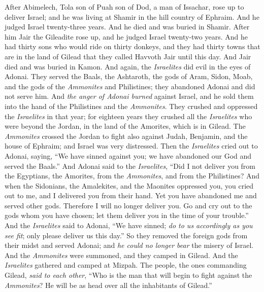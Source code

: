 \begin{biblechapter} %
 After Abimelech, Tola son of Puah son of Dod, a man of Issachar, rose up to deliver Israel; and he was living at Shamir in the hill country of Ephraim.
\verse And he judged Israel twenty-three years. And he died and was buried in Shamir.
\verse After him Jair the Gileadite rose up, and he judged Israel twenty-two years.
\verse And he had thirty sons who would ride on thirty donkeys, and they had thirty towns that are in the land of Gilead that they called Havvoth Jair until this day.
\verse And Jair died and was buried in Kamon.
\verse And again, the \textit{Israelites} did evil in the eyes of Adonai. They served the Baals, the Ashtaroth, the gods of Aram, Sidon, Moab, and the gods of the \textit{Ammonites} and Philistines; they abandoned Adonai and did not serve him.
\verse And \textit{the anger of Adonai burned} against Israel, and he sold them into the hand of the Philistines and the \textit{Ammonites}.
\verse They crushed and oppressed the \textit{Israelites} in that year; for eighteen years they crushed all the \textit{Israelites} who were beyond the Jordan, in the land of the Amorites, which is in Gilead.
\verse The \textit{Ammonites} crossed the Jordan to fight also against Judah, Benjamin, and the house of Ephraim; and Israel was very distressed.
\verse Then the \textit{Israelites} cried out to Adonai, saying, “We have sinned against you; we have abandoned our God and served the Baals.”
\verse And Adonai said to the \textit{Israelites}, “Did I not deliver you from the Egyptians, the Amorites, from the \textit{Ammonites}, and from the Philistines?
\verse And when the Sidonians, the Amalekites, and the Maonites oppressed you, you cried out to me, and I delivered you from their hand.
\verse Yet you have abandoned me and served other gods. Therefore I will no longer deliver you.
\verse Go and cry out to the gods whom you have chosen; let them deliver you in the time of your trouble.”
\verse And the \textit{Israelites} said to Adonai, “We have sinned; \textit{do to us accordingly as you see fit}; only please deliver us this day.”
\verse So they removed the foreign gods from their midst and served Adonai; and \textit{he could no longer bear} the misery of Israel.
\verse And the \textit{Ammonites} were summoned, and they camped in Gilead. And the \textit{Israelites} gathered and camped at Mizpah.
\verse The people, the ones commanding Gilead, \textit{said to each other}, “Who is the man that will begin to fight against the \textit{Ammonites}? He will be as head over all the inhabitants of Gilead.”
\end{biblechapter}

